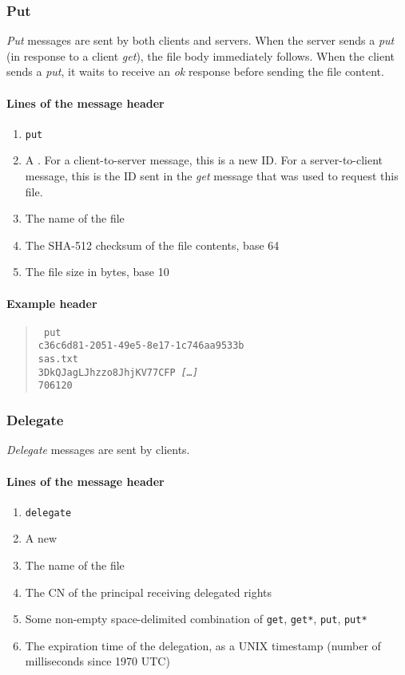 \documentclass[10pt]{article}
\begin{document}
\subsubsection{Put}

\textit{Put} messages are sent by both clients and servers.
When the server sends a \textit{put} (in response to a client \textit{get}),
the file body immediately follows.
When the client sends a \textit{put}, it waits to receive an \textit{ok}
response before sending the file content.

\paragraph{Lines of the message header}
\begin{enumerate}
\item \texttt{put}
\item A . For a client-to-server message, this is a new ID.
      For a server-to-client message, this is the ID sent in the \textit{get}
      message that was used to request this file.
\item The name of the file
\item The SHA-512 checksum of the file contents, base 64
\item The file size in bytes, base 10
\end{enumerate}

\paragraph{Example header}
\begin{quote}
\texttt{%
put \\
c36c6d81-2051-49e5-8e17-1c746aa9533b \\
sas.txt \\
3DkQJagLJhzzo8JhjKV77CFP \textit{[\ldots]} \\
706120
}
\end{quote}

\subsubsection{Delegate}

\textit{Delegate} messages are sent by clients.

\paragraph{Lines of the message header}
\begin{enumerate}
\item \texttt{delegate}
\item A new 
\item The name of the file
\item The CN of the principal receiving delegated rights
\item Some non-empty space-delimited combination of \texttt{get}, \texttt{get*}, \texttt{put}, \texttt{put*}
\item The expiration time of the delegation, as a UNIX timestamp (number of milliseconds since 1970 UTC)
\end{enumerate}
\end{document}
